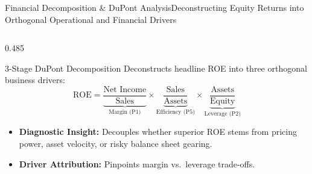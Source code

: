 \begin{frame}{Financial Decomposition \& DuPont Analysis}{Deconstructing Equity Returns into Orthogonal Operational and Financial Drivers}
    \vspace{-0.20cm}
    \begin{columns}[T,onlytextwidth]
        \begin{column}{0.485\textwidth}
            \begin{mathcard}[height=2.74cm]{3-Stage DuPont Decomposition}
                \fontsize{5.7pt}{6.9pt}\selectfont
                Deconstructs headline ROE into three orthogonal business drivers:
                \begin{equation*}
                    \textstyle \text{ROE} = \underbrace{\frac{\text{Net Income}}{\text{Sales}}}_{\text{Margin (P1)}} \times \underbrace{\frac{\text{Sales}}{\text{Assets}}}_{\text{Efficiency (P5)}} \times \underbrace{\frac{\text{Assets}}{\text{Equity}}}_{\text{Leverage (P2)}}
                \end{equation*}
                \begin{itemize}
                    \setlength{\itemsep}{1.2pt}
                    \item \textbf{Diagnostic Insight:} Decouples whether superior ROE stems from pricing power, asset velocity, or risky balance sheet gearing.
                    \item \textbf{Driver Attribution:} Pinpoints margin vs.\ leverage trade-offs.
                \end{itemize}
            \end{mathcard}

            \vspace{0.12cm}


\end{column}
\end{columns}
\end{frame}
